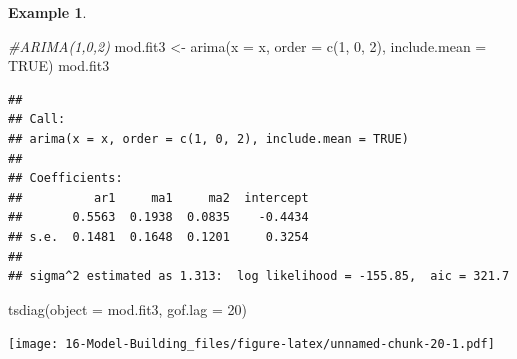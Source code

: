 \documentclass[
]{book}
\newenvironment{Shaded}{\begin{snugshade}}{\end{snugshade}}
\newcommand{\AttributeTok}[1]{\textcolor[rgb]{0.77,0.63,0.00}{#1}}
\newcommand{\CommentTok}[1]{\textcolor[rgb]{0.56,0.35,0.01}{\textit{#1}}}
\newcommand{\ConstantTok}[1]{\textcolor[rgb]{0.00,0.00,0.00}{#1}}
\newcommand{\DecValTok}[1]{\textcolor[rgb]{0.00,0.00,0.81}{#1}}
\newcommand{\FunctionTok}[1]{\textcolor[rgb]{0.00,0.00,0.00}{#1}}
\newcommand{\NormalTok}[1]{#1}
\newcommand{\OtherTok}[1]{\textcolor[rgb]{0.56,0.35,0.01}{#1}}
\newcommand{\SpecialCharTok}[1]{\textcolor[rgb]{0.00,0.00,0.00}{#1}}
\newcommand{\StringTok}[1]{\textcolor[rgb]{0.31,0.60,0.02}{#1}}
\theoremstyle{definition}
\theoremstyle{definition}
\newtheorem{example}{Example}[chapter]
\theoremstyle{definition}
\theoremstyle{definition}
\theoremstyle{remark}
\begin{document}
\begin{example}
\begin{Shaded}
\begin{Highlighting}[]
\CommentTok{\#ARIMA(1,0,2)}
\NormalTok{mod.fit3 }\OtherTok{\textless{}{-}} \FunctionTok{arima}\NormalTok{(}\AttributeTok{x =}\NormalTok{ x, }\AttributeTok{order =} \FunctionTok{c}\NormalTok{(}\DecValTok{1}\NormalTok{, }\DecValTok{0}\NormalTok{, }\DecValTok{2}\NormalTok{), }\AttributeTok{include.mean =} \ConstantTok{TRUE}\NormalTok{)}
\NormalTok{mod.fit3}
\end{Highlighting}
\end{Shaded}

\begin{verbatim}
## 
## Call:
## arima(x = x, order = c(1, 0, 2), include.mean = TRUE)
## 
## Coefficients:
##          ar1     ma1     ma2  intercept
##       0.5563  0.1938  0.0835    -0.4434
## s.e.  0.1481  0.1648  0.1201     0.3254
## 
## sigma^2 estimated as 1.313:  log likelihood = -155.85,  aic = 321.7
\end{verbatim}

\begin{Shaded}
\begin{Highlighting}[]
\FunctionTok{tsdiag}\NormalTok{(}\AttributeTok{object =}\NormalTok{ mod.fit3, }\AttributeTok{gof.lag =} \DecValTok{20}\NormalTok{)}
\end{Highlighting}
\end{Shaded}

\texttt{[image: 16-Model-Building\_files/figure-latex/unnamed-chunk-20-1.pdf]}

\begin{Shaded}
\end{Shaded}
\end{example}
\end{document}
